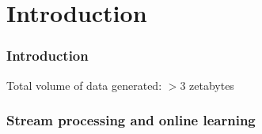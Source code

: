 \section{Introduction}

\begin{frame}
\frametitle{Introduction}

\LARGE Total volume of data generated: $>3$ zetabytes

\end{frame}

\begin{frame}
\frametitle{Stream processing and online learning}

\end{frame}
